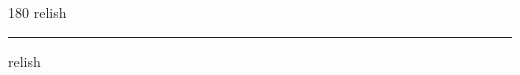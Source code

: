 
\begin{frame}
\begin{center}
\begin{turn}{180}
{\fontsize{2.5cm}{1em}\selectfont relish}
\end{turn}
\vspace{1em}\par  
\hrule
\vspace{1em}\par  
{\fontsize{2.5cm}{1em}\selectfont relish}
\end{center}
\end{frame}
